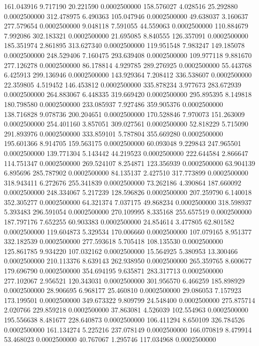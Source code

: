 161.043916 9.717190 20.221590 0.0002500000
158.576027 4.028516 25.292880 0.0002500000
312.478975 6.490363 105.047946 0.0002500000
49.638037 3.160637 277.579654 0.0002500000
9.048118 7.591055 44.559063 0.0002500000
110.884679 7.992086 302.183321 0.0002500000
21.695085 8.840555 126.357091 0.0002500000
185.351974 2.861895 313.627340 0.0002500000
119.951548 7.983247 149.185078 0.0002500000
248.529406 7.160475 293.639408 0.0002500000
109.977118 9.881670 277.126278 0.0002500000
86.178814 4.929785 289.276925 0.0002500000
55.443768 6.425913 299.136946 0.0002500000
143.929364 7.208412 336.538607 0.0002500000
22.359805 4.519452 146.453812 0.0002500000
335.878234 3.977673 283.672939 0.0002500000
264.883067 6.448335 319.669420 0.0002500000
295.895395 8.149818 180.798580 0.0002500000
233.085937 7.927486 359.905376 0.0002500000
138.716828 9.078736 200.204651 0.0002500000
170.528846 7.970073 151.263009 0.0002500000
254.401160 3.857051 309.027561 0.0002500000
52.818229 5.715090 291.893976 0.0002500000
333.859101 5.787804 355.669280 0.0002500000
195.601366 8.914705 159.563175 0.0002500000
60.093048 9.229843 247.965501 0.0002500000
139.771304 5.143442 44.219523 0.0002500000
222.644584 2.866647 114.751347 0.0002500000
269.524107 8.254871 123.356939 0.0002500000
63.904139 6.895696 285.787902 0.0002500000
84.135137 2.427510 317.773899 0.0002500000
318.943411 6.272676 255.341839 0.0002500000
73.262186 4.390864 187.660092 0.0002500000
248.334067 5.217239 128.596826 0.0002500000
207.259790 6.140018 352.305277 0.0002500000
64.321374 7.037175 49.868234 0.0002500000
318.598937 5.393483 296.591054 0.0002500000
270.109995 8.335168 255.657519 0.0002500000
187.797176 7.652255 60.903383 0.0002500000
24.854614 3.477805 62.801582 0.0002500000
119.604873 5.329534 170.006660 0.0002500000
107.079165 8.951377 332.182539 0.0002500000
277.593618 5.705418 108.135530 0.0002500000
125.861785 9.934220 107.032162 0.0002500000
15.564925 5.380953 13.300466 0.0002500000
210.113376 8.639143 262.938950 0.0002500000
265.359765 8.600677 179.696790 0.0002500000
354.694195 9.635871 283.317713 0.0002500000
277.102067 2.956521 120.343031 0.0002500000
301.956570 6.466259 185.898929 0.0002500000
28.906695 6.968177 25.460810 0.0002500000
29.086053 7.157923 173.199501 0.0002500000
349.673322 9.809799 24.548400 0.0002500000
275.875714 2.020766 229.859218 0.0002500000
37.863081 4.526039 102.554963 0.0002500000
195.556638 8.481677 228.640873 0.0002500000
106.411294 8.650109 326.784526 0.0002500000
161.134274 5.225216 237.078149 0.0002500000
166.070819 8.479914 53.468023 0.0002500000
40.767067 1.295746 117.034968 0.0002500000
